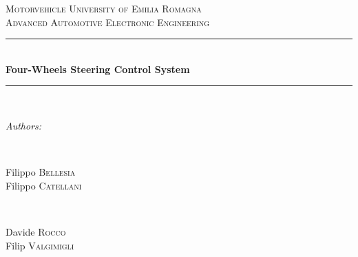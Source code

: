 
\begin{titlepage}

\newcommand{\HRule}{\rule{\linewidth}{0.5mm}} %

\center %
 

\textsc{\LARGE Motorvehicle University of Emilia Romagna}\\[1.35 cm] %
\textsc{\Large Advanced Automotive Electronic Engineering}\\[0.5cm] %


\HRule \\[0.4cm]
{ \huge \bfseries Four-Wheels Steering Control System}\\[0.4cm] %
\HRule \\[1.5cm]
 

\begin{minipage}{0.4\textwidth}
	\begin{flushleft} \large
		\emph{Authors:} \\
	\end{flushleft}
\end{minipage}
~
\begin{minipage}{0.4\textwidth}
	\begin{flushright}
	\end{flushright}
\end{minipage}

\medskip
\begin{minipage}{0.4\textwidth}
	\begin{flushleft}
		\large
		Filippo \textsc{Bellesia} \\
		Filippo \textsc{Catellani}  \\
	\end{flushleft}
\end{minipage}
~
\begin{minipage}{0.4\textwidth}
	\begin{flushright}
		\large
		Davide \textsc{Rocco} \\
		Filip \textsc{Valgimigli}  \\	
	\end{flushright}
\end{minipage}


\end{titlepage}
